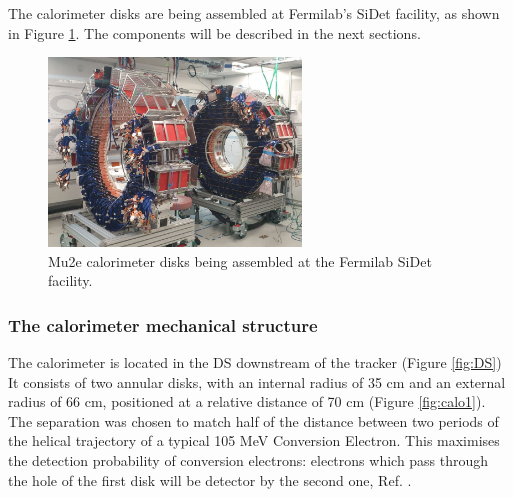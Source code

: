 The calorimeter disks are being assembled at Fermilab's SiDet facility, as shown in Figure 
\ref{fig:calostatus}. The components will be described in the next sections.

\begin{figure}[!h]
    \centering
    \includegraphics[width =0.6\textwidth]{figures/png/Screenshot_20240706_151533.png}
    \caption[The Mu2e calorimeter disks.]{Mu2e calorimeter disks being assembled at the Fermilab SiDet facility.}
    \label{fig:calostatus}
\end{figure}

\subsubsection{The calorimeter mechanical structure}
The calorimeter is located in the DS downstream of the tracker (Figure \ref{fig:DS})
It consists of two annular disks, with an internal radius of 35 cm and 
an external radius of 66 cm, positioned at a relative distance of 70 cm (Figure \ref{fig:calo1}).
The separation was chosen to match half of the distance between two periods of the helical trajectory 
of a typical 105 MeV Conversion Electron. This maximises the detection probability of conversion 
electrons: electrons which pass through the hole of the first disk will be detector by the second one, Ref. \cite{em7}. 


